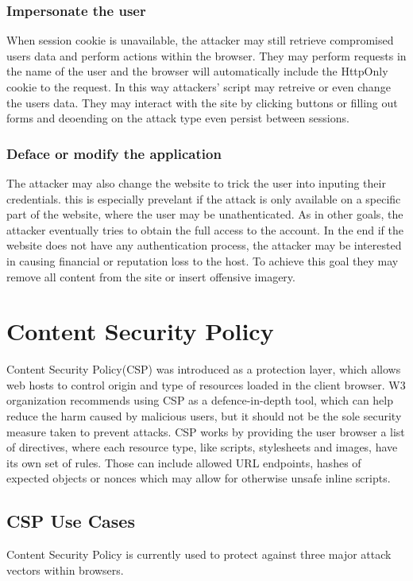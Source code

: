 \subsubsection{Impersonate the user}
When session cookie is unavailable, the attacker may still retrieve compromised users data and perform actions within the browser.
They may perform requests in the name of the user and the browser will automatically include the HttpOnly cookie to the request.
In this way attackers' script may retreive or even change the users data.
They may interact with the site by clicking buttons or filling out forms and deoending on the attack type even persist between sessions.

\subsubsection{Deface or modify the application}
The attacker may also change the website to trick the user into inputing their credentials.
this is especially prevelant if the attack is only available on a specific part of the website, where the user may be unathenticated.
As in other goals, the attacker eventually tries to obtain the full access to the account.
In the end if the website does not have any authentication process, the attacker may be interested in causing financial or reputation loss to the host.
To achieve this goal they may remove all content from the site or insert offensive imagery.

\section{Content Security Policy}
Content Security Policy(CSP) was introduced as a protection layer, which allows web hosts to control origin and type of resources loaded in the client browser. 
W3 organization recommends using CSP as a defence-in-depth tool, which can help reduce the harm caused by malicious users, but it should not be the sole security measure taken to prevent attacks. \cite{CSPLevel3}
CSP works by providing the user browser a list of directives, where each resource type, like scripts, stylesheets and images, have its own set of rules.
Those can include allowed URL endpoints, hashes of expected objects or nonces which may allow for otherwise unsafe inline scripts.

\subsection{CSP Use Cases}
Content Security Policy is currently used to protect against three major attack vectors within browsers.

